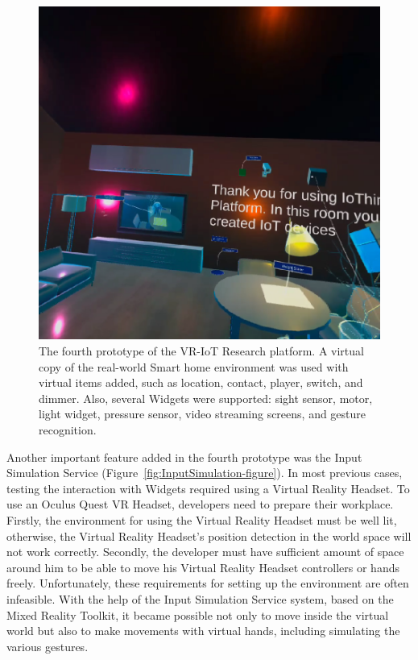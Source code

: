 \begin{figure}
  \centering
  \includegraphics[width=0.6\linewidth]{figures/Prototype4.png}
  \caption{The fourth prototype of the VR-IoT Research platform. A virtual copy of the real-world Smart home environment was used with virtual items added, such as location, contact, player, switch, and dimmer. Also, several Widgets were supported: sight sensor, motor, light widget, pressure sensor, video streaming screens, and gesture recognition.}
  \label{fig:Prototype4-figure}
\end{figure}

Another important feature added in the fourth prototype was the Input Simulation Service (Figure~\ref{fig:InputSimulation-figure}). In most previous cases, testing the interaction with Widgets required using a Virtual Reality Headset. To use an Oculus Quest VR Headset, developers need to prepare their workplace. Firstly, the environment for using the Virtual Reality Headset must be well lit, otherwise, the Virtual Reality Headset's position detection in the world space will not work correctly. Secondly, the developer must have sufficient amount of space around him to be able to move his Virtual Reality Headset controllers or hands freely. Unfortunately, these requirements for setting up the environment are often infeasible. With the help of the Input Simulation Service system, based on the Mixed Reality Toolkit, it became possible not only to move inside the virtual world but also to make movements with virtual hands, including simulating the various gestures.

